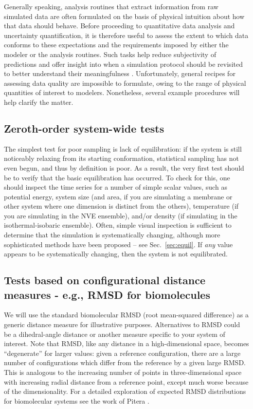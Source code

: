 Generally speaking, analysis routines that extract information from raw simulated data are often formulated on the basis of physical intuition about how that data should behave.  Before proceeding to quantitative data analysis and uncertainty quantification, it is therefore useful to assess the extent to which data conforms to these expectations and the requirements imposed by either the modeler or the analysis routines.  Such tasks help reduce subjectivity of predictions and offer insight into when a simulation protocol should be revisited to better understand their meaningfulness \cite{patrone1}.  Unfortunately, general recipes for assessing data quality are impossible to formulate, owing to the range of physical quantities of interest to modelers.  Nonetheless, several example procedures will help clarify the matter.

\subsection{Zeroth-order system-wide tests}

The simplest test for poor sampling is lack of equilibration: if the system is still noticeably relaxing from its starting conformation, statistical sampling has not even begun, and thus by definition is poor.  As a result, the very first test should be to verify that the basic equilibration has occurred.  To check for this, one should inspect the time series for a number of simple scalar values, such as potential energy, system size (and area, if you are simulating a membrane or other system where one dimension is distinct from the others), temperature (if you are simulating in the NVE ensemble), and/or density (if simulating in the isothermal-isobaric ensemble).  Often, simple visual inspection is sufficient to determine that the simulation is systematically changing, although more sophisticated methods have been proposed -- see Sec.\ \ref{sec:equil}.  If \emph{any} value appears to be systematically changing, then the system is not equilibrated.

\subsection{Tests based on configurational distance measures - e.g., RMSD for biomolecules}
We will use the standard biomolecular RMSD (root mean-squared difference) as a generic distance measure for illustrative purposes.
Alternatives to RMSD could be a dihedral-angle distance or another measure specific to your system of interest.
Note that RMSD, like any distance in a high-dimensional space, becomes ``degenerate'' for larger values: given a reference configuration, there are a large number of configurations which differ from the reference by a given large RMSD. This is analogous to the increasing number of points in three-dimensional space with increasing radial distance from a reference point, except much worse because of the dimensionality. For a detailed exploration of expected RMSD distributions for biomolecular systems see the work of Pitera \citep{Pitera2014}.

